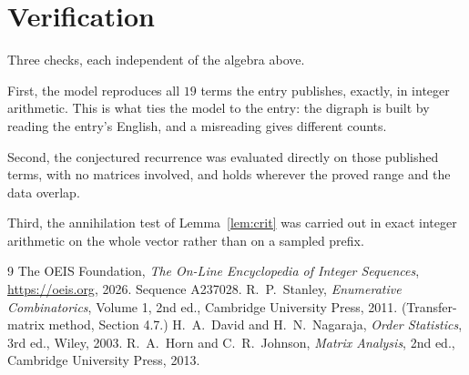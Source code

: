 \documentclass[11pt,a4paper]{article}
\theoremstyle{plain}
\theoremstyle{definition}
\begin{document}
\section{Verification}

Three checks, each independent of the algebra above.

First, the model reproduces all $19$ terms the entry publishes, exactly, in integer
arithmetic. This is what ties the model to the entry: the digraph is built by reading the
entry's English, and a misreading gives different counts.

Second, the conjectured recurrence was evaluated directly on those published terms, with no
matrices involved, and holds wherever the proved range and the data overlap.

Third, the annihilation test of Lemma~\ref{lem:crit} was carried out in exact integer
arithmetic on the whole vector rather than on a sampled prefix.

\begin{thebibliography}{9}
 The OEIS Foundation, \emph{The On-Line Encyclopedia of Integer
Sequences}, \url{https://oeis.org}, 2026. Sequence A237028.
 R.~P.~Stanley, \emph{Enumerative Combinatorics}, Volume 1, 2nd ed.,
Cambridge University Press, 2011. (Transfer-matrix method, Section 4.7.)
 H.~A.~David and H.~N.~Nagaraja, \emph{Order Statistics}, 3rd ed., Wiley,
2003.
 R.~A.~Horn and C.~R.~Johnson, \emph{Matrix Analysis}, 2nd ed., Cambridge
University Press, 2013.
\end{thebibliography}
\end{document}
